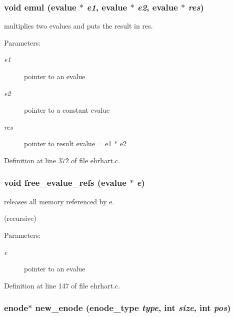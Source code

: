 \subsubsection{\setlength{\rightskip}{0pt plus 5cm}void emul (evalue $\ast$ {\em e1}, evalue $\ast$ {\em e2}, evalue $\ast$ {\em res})\hspace{0.3cm}{\tt  [static]}}\label{ehrhart_8c_a14}


multiplies two evalues and puts the result in res.

\begin{Desc}
\item[Parameters: ]\par
\begin{description}
\item[{\em 
e1}]pointer to an evalue \item[{\em 
e2}]pointer to a constant evalue \item[{\em 
res}]pointer to result evalue = e1 $\ast$ e2 \end{description}
\end{Desc}


Definition at line 372 of file ehrhart.c.
\subsubsection{\setlength{\rightskip}{0pt plus 5cm}void free\_\-evalue\_\-refs (evalue $\ast$ {\em e})}\label{ehrhart_8c_a8}


releases all memory referenced by e.

(recursive)  \begin{Desc}
\item[Parameters: ]\par
\begin{description}
\item[{\em 
e}]pointer to an evalue \end{description}
\end{Desc}


Definition at line 147 of file ehrhart.c.
\subsubsection{\setlength{\rightskip}{0pt plus 5cm}enode$\ast$ new\_\-enode (enode\_\-type {\em type}, int {\em size}, int {\em pos})}\label{ehrhart_8c_a7}


